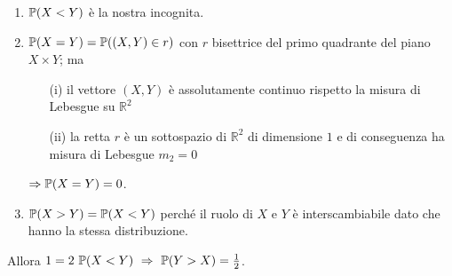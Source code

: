 \begin{enumerate}
\item $\mathbb{P}(X<Y)$ è la nostra incognita.
\item $\mathbb{P}(X=Y)=\mathbb{P}((X,Y)\in r)$ con $r$ bisettrice del primo quadrante del piano $X\times Y$; ma
\begin{enumerate} 
\item [(i)] il vettore $(X,Y)$ è assolutamente continuo rispetto la misura di Lebesgue su $\mathbb{R}^2$
\item [(ii)] la retta $r$ è un sottospazio di $\mathbb{R}^2$ di dimensione $1$ e di conseguenza ha misura di Lebesgue $m_2=0$
\end{enumerate}
$\Rightarrow \mathbb{P}(X=Y)=0$.
\item $\mathbb{P}(X>Y)=\mathbb{P}(X<Y)$ perché il ruolo di $X$ e $Y$ è interscambiabile dato che hanno la stessa distribuzione.
\end{enumerate}
Allora $1=2\ \PP(X<Y)\ \Rightarrow\ \PP(Y>X)=\frac{1}{2}$.

